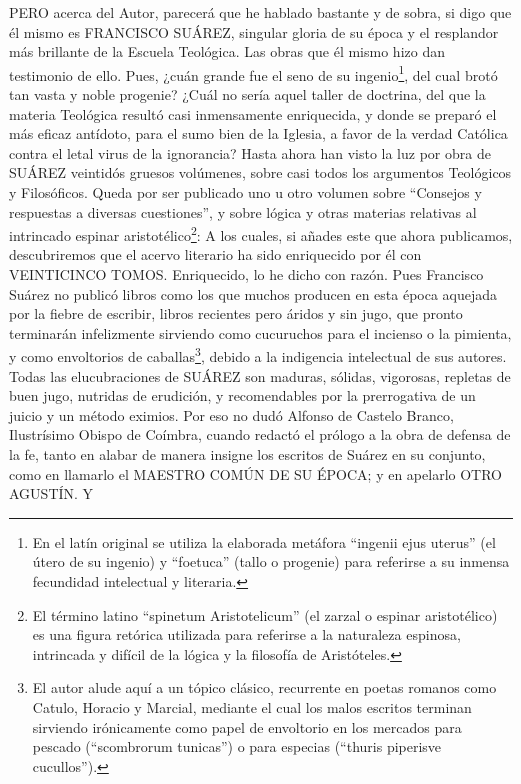 \documentclass{article}
\begin{document}
PERO acerca del Autor, parecerá que he hablado bastante y de sobra, si digo que él mismo
es FRANCISCO SUÁREZ, singular gloria de su época y el resplandor más brillante de la
Escuela Teológica. Las obras que él mismo hizo dan testimonio de ello. Pues, ¿cuán
grande fue el seno de su ingenio\footnote{En el latín original se utiliza la elaborada
metáfora \enquote{ingenii ejus uterus} (el útero de su ingenio) y \enquote{foetuca}
(tallo o progenie) para referirse a su inmensa fecundidad intelectual y literaria.}, del
cual brotó tan vasta y noble progenie? ¿Cuál no sería aquel taller de doctrina, del que
la materia Teológica resultó casi inmensamente enriquecida, y donde se preparó el más
eficaz antídoto, para el sumo bien de la Iglesia, a favor de la verdad Católica contra
el letal virus de la ignorancia? Hasta ahora han visto la luz por obra de SUÁREZ
veintidós gruesos volúmenes, sobre casi todos los argumentos Teológicos y Filosóficos.
Queda por ser publicado uno u otro volumen sobre \enquote{Consejos y respuestas a
diversas cuestiones}, y sobre lógica y otras materias relativas al intrincado espinar
aristotélico\footnote{El término latino \enquote{spinetum Aristotelicum} (el zarzal o
espinar aristotélico) es una figura retórica utilizada para referirse a la naturaleza
espinosa, intrincada y difícil de la lógica y la filosofía de Aristóteles.}: A los
cuales, si añades este que ahora publicamos, descubriremos que el acervo literario ha
sido enriquecido por él con VEINTICINCO TOMOS. Enriquecido, lo he dicho con razón. Pues
Francisco Suárez no publicó libros como los que muchos producen en esta época aquejada
por la fiebre de escribir, libros recientes pero áridos y sin jugo, que pronto
terminarán infelizmente sirviendo como cucuruchos para el incienso o la pimienta, y como
envoltorios de caballas\footnote{El autor alude aquí a un tópico clásico, recurrente en
poetas romanos como Catulo, Horacio y Marcial, mediante el cual los malos escritos
terminan sirviendo irónicamente como papel de envoltorio en los mercados para pescado
(\enquote{scombrorum tunicas}) o para especias (\enquote{thuris piperisve cucullos}).},
debido a la indigencia intelectual de sus autores. Todas las elucubraciones de SUÁREZ
son maduras, sólidas, vigorosas, repletas de buen jugo, nutridas de erudición, y
recomendables por la prerrogativa de un juicio y un método eximios. Por eso no dudó
Alfonso de Castelo Branco, Ilustrísimo Obispo de Coímbra, cuando redactó el prólogo a la
obra de defensa de la fe, tanto en alabar de manera insigne los escritos de Suárez en su
conjunto, como en llamarlo el MAESTRO COMÚN DE SU ÉPOCA; y en apelarlo OTRO AGUSTÍN. Y
\end{document}
